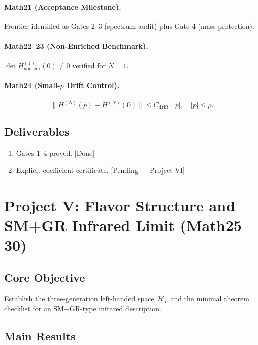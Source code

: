 \documentclass[11pt,a4paper]{article}
\newcommand{\HilL}{\mathcal{H}_{L}}
\begin{document}
\paragraph{Math21 (Acceptance Milestone).}
Frontier identified as Gates 2--3 (spectrum audit) plus Gate 4 (mass protection).

\paragraph{Math22--23 (Non-Enriched Benchmark).}
$\det H_{\mathrm{non\text{-}enr}}^{(1)}(0)\neq0$ verified for $N=1$.

\paragraph{Math24 (Small-$p$ Drift Control).}
\begin{equation}
\|H^{(N)}(p)-H^{(N)}(0)\|\leq C_{\mathrm{drift}}\cdot|p|,\quad|p|\leq\rho.
\end{equation}

\subsection{Deliverables}
\begin{enumerate}
\item Gates 1--4 proved. \hfill\textcolor{green!55!black}{[Done]}
\item Explicit coefficient certificate. \hfill\textcolor{red!70!black}{[Pending --- Project VI]}
\end{enumerate}

\section{Project V: Flavor Structure and SM+GR Infrared Limit (Math25--30)}

\subsection{Core Objective}
Establish the three-generation left-handed space $\HilL$ and the
minimal theorem checklist for an SM$+$GR-type infrared description.

\subsection{Main Results}
\end{document}
